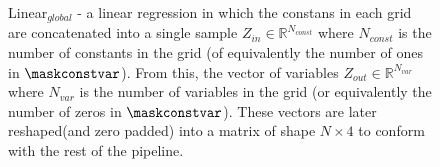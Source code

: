 \usetikzlibrary{arrows,positioning,shapes.geometric, calc}
\begin{figure}[H]
    \caption{Linear$_{global}$ - a linear regression in which the constans in each grid are concatenated into a single sample
        $Z_{in} \in \mathbb{R}^{N_{const}}$ where $N_{const}$ is the number of constants in the grid (of equivalently the number
        of ones in $\maskconstvar$).
        From this, the vector of variables $Z_{out} \in \mathbb{R}^{N_{var}}$ where $N_{var}$ is the number of variables in the grid
        (or equivalently the number of zeros in $\maskconstvar$).
        These vectors are later reshaped(and zero padded) into a matrix of shape $N \times 4$
        to conform with the rest of the pipeline.}%
    \label{fig:linear_global}%
\end{figure}
